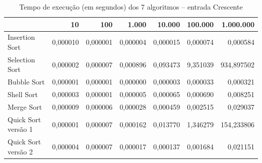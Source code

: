 \begin{table}[htbp]
    \centering
    \begin{tabular}{|l|r|r|r|r|r|r|}
        \hline
         & 10 & 100 & 1.000 & 10.000 & 100.000 & 1.000.000 \\
        \hline
        Insertion Sort & 0,000010 & 0,000001 & 0,000004 & 0,000015 & 0,000074 & 0,000584 \\
        \hline
        Selection Sort & 0,000002 & 0,000007 & 0,000896 & 0,093473 & 9,351039 & 934,897502 \\
        \hline
        Bubble Sort & 0,000001 & 0,000001 & 0,000000 & 0,000003 & 0,000033 & 0,000321 \\
        \hline
        Shell Sort & 0,000003 & 0,000001 & 0,000005 & 0,000065 & 0,000690 & 0,008251 \\
        \hline
        Merge Sort & 0,000009 & 0,000006 & 0,000028 & 0,000459 & 0,002515 & 0,029037 \\
        \hline
        Quick Sort versão 1 & 0,000001 & 0,000007 & 0,000162 & 0,013770 & 1,346279 & 154,233806 \\
        \hline
        Quick Sort versão 2 & 0,000004 & 0,000007 & 0,000017 & 0,000137 & 0,001684 & 0,021151 \\
        \hline
    \end{tabular}
    \caption{Tempo de execução (em segundos) dos 7 algoritmos -- entrada Crescente}
    \label{tab:comparacao_crescente}
\end{table}
